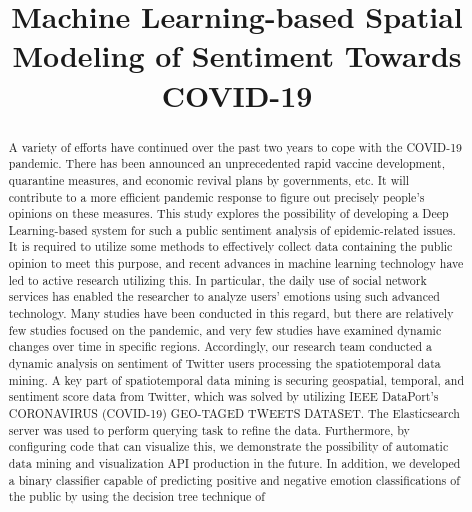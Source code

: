 \documentclass[conference]{IEEEtran}
\begin{document}
\title{Machine Learning-based Spatial Modeling of Sentiment Towards COVID-19}

\author{
}

\maketitle

\begin{abstract}
A variety of efforts have continued over the past two years to cope with the
COVID-19 pandemic. There has been announced an unprecedented rapid vaccine
development, quarantine measures, and economic revival plans by governments,
etc. It will contribute to a more efficient pandemic response to figure out
precisely people's opinions on these measures. This study explores the
possibility of developing a Deep Learning-based system for such a public
sentiment analysis of epidemic-related issues. It is required to utilize some
methods to effectively collect data containing the public opinion to meet
this purpose, and recent advances in machine learning technology have led to
active research utilizing this. In particular, the daily use of social
network services has enabled the researcher to analyze users' emotions using
such advanced technology. Many studies have been conducted in this regard,
but there are relatively few studies focused on the pandemic, and very few
studies have examined dynamic changes over time in specific regions.
Accordingly, our research team conducted a dynamic analysis on sentiment of
Twitter users processing the spatiotemporal data mining. A key part of
spatiotemporal data mining is securing geospatial, temporal, and sentiment
score data from Twitter, which was solved by utilizing IEEE DataPort's
CORONAVIRUS (COVID-19) GEO-TAGED TWEETS DATASET. The Elasticsearch server was
used to perform querying task to refine the data. Furthermore, by configuring
code that can visualize this, we demonstrate the possibility of automatic
data mining and visualization API production in the future. In addition, we
developed a binary classifier capable of predicting positive and negative
emotion classifications of the public by using the decision tree technique of

\end{abstract}
\end{document}
